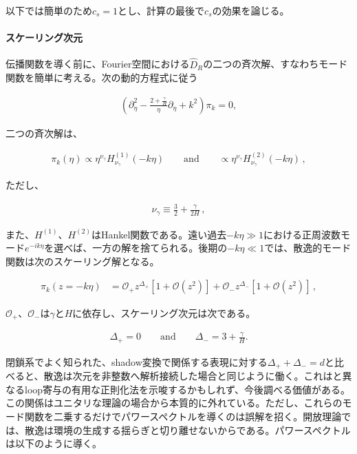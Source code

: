 \documentclass[a4paper,11pt]{ltjsarticle}
\numberwithin{equation}{section}
\newcommand{\ee}{e}
\begin{document}
以下では簡単のため$c_s=1$とし、計算の最後で$c_s$の効果を論じる。

\paragraph{スケーリング次元} 伝播関数を導く前に、Fourier空間における$\widehat D_R$の二つの斉次解、すなわちモード関数を簡単に考える。次の動的方程式に従う

\begin{align}
\left(\partial_{\eta}^2 - \frac{2 + \frac{\gamma}{H}}{\eta}\partial_{\eta} +  k^2  \right) \pi_k =0,
\end{align}

二つの斉次解は、

\begin{align}
\pi_k(\eta) \propto \eta^{\nu_\gamma}  H^{(1)}_{\nu_\gamma}(- k \eta) \qquad \mathrm{and} \qquad \propto \eta^{\nu_\gamma} H^{(2)}_{\nu_\gamma}(- k \eta) \,,
\end{align}

ただし、

\begin{align}
    \nu_\gamma \equiv \frac{3}{2}+ \frac{\gamma}{2H}\,,
\end{align}

また、$H^{(1)}$、$H^{(2)}$はHankel関数である。遠い過去$-k\eta\gg1$における正周波数モード$\ee^{-ik\eta}$を選べば、一方の解を捨てられる。後期の$-k\eta\ll1$では、散逸的モード関数は次のスケーリング解となる。

\begin{align}
\pi_k(z = - k \eta) &=  \mathcal{O}_+  z^{\Delta_+}  \left[1 +\mathcal{O}(z^2) \right] + \mathcal{O}_- z^{\Delta_-}  \left[1 +\mathcal{O}(z^2) \right]\,,
\end{align}

$\mathcal O_+$、$\mathcal O_-$は$\gamma$と$H$に依存し、スケーリング次元は次である。

\begin{align}
\Delta_+ = 0 \qquad \mathrm{and} \qquad \Delta_- = 3 + \frac{\gamma}{H}.
\end{align}

閉鎖系でよく知られた、shadow変換で関係する表現に対する$\Delta_++\Delta_-=d$と比べると、散逸は次元を非整数へ解析接続した場合と同じように働く。これは\cite{Senatore:2009cf,Melville:2021lst,Lee:2023jby}と異なるloop寄与の有用な正則化法を示唆するかもしれず、今後調べる価値がある。この関係はユニタリな理論の場合から本質的に外れている。ただし、これらのモード関数を二乗するだけでパワースペクトルを導くのは誤解を招く。開放理論では、散逸は環境の生成する揺らぎと切り離せないからである\cite{breuerTheoryOpenQuantum2002}。パワースペクトルは以下のように導く。
\end{document}
